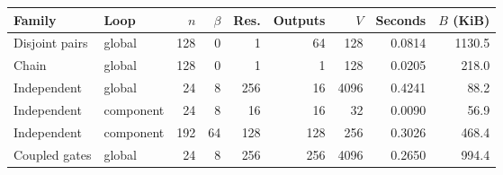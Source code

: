 \begin{tabular}{llrrrrrrr}
\toprule
Family & Loop & $n$ & $\beta$ & Res. & Outputs & $V$ & Seconds & $B$ (KiB)\\
\midrule
Disjoint pairs & global & 128 & 0 & 1 & 64 & 128 & 0.0814 & 1130.5\\
Chain & global & 128 & 0 & 1 & 1 & 128 & 0.0205 & 218.0\\
Independent & global & 24 & 8 & 256 & 16 & 4096 & 0.4241 & 88.2\\
Independent & component & 24 & 8 & 16 & 16 & 32 & 0.0090 & 56.9\\
Independent & component & 192 & 64 & 128 & 128 & 256 & 0.3026 & 468.4\\
Coupled gates & global & 24 & 8 & 256 & 256 & 4096 & 0.2650 & 994.4\\
\bottomrule
\end{tabular}
